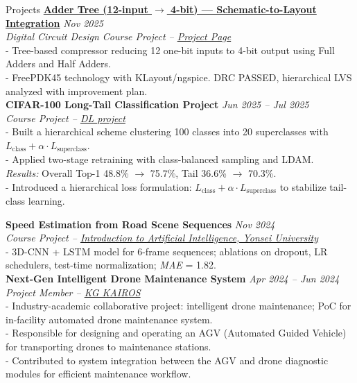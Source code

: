 \documentclass{resume} %
\begin{document}
\begin{rSection}{Projects}
\href{https://choihyun-1110.github.io/projects/adder-tree.html}{\bf Adder Tree (12-input $\rightarrow$ 4-bit) — Schematic-to-Layout Integration} \hfill {\em Nov 2025}  
\\{\textit{Digital Circuit Design Course Project – \href{https://choihyun-1110.github.io/projects/adder-tree.html}{Project Page}}}  
\\- Tree-based compressor reducing 12 one-bit inputs to 4-bit output using Full Adders and Half Adders.
\\- FreePDK45 technology with KLayout/ngspice. DRC PASSED, hierarchical LVS analyzed with improvement plan.
\\

{\bf CIFAR-100 Long-Tail Classification Project} \hfill {\em Jun 2025 – Jul 2025}  
\\{\textit{Course Project – \href{https://www.notion.so/CIFAR-100-Long-Tail-Classification-Project-23f2d399f9118066b2dad938f1925249}{DL project}}}  
\\- Built a hierarchical scheme clustering 100 classes into 20 superclasses with $L_{\text{class}} + \alpha \cdot L_{\text{superclass}}$.  
\\- Applied two-stage retraining with class-balanced sampling and LDAM.
\\
  \textit{Results:} Overall Top-1 48.8\% $\rightarrow$ 75.7\%, Tail 36.6\% $\rightarrow$ 70.3\%.
\\- Introduced a hierarchical loss formulation: $L_{\text{class}} + \alpha \cdot L_{\text{superclass}}$ to stabilize tail-class learning.

{\bf Speed Estimation from Road Scene Sequences} \hfill {\em Nov 2024} 
\\{\textit{Course Project – \href{https://disco-candy-c65.notion.site/AI-1ec2d399f911802d9954c1662a5e78d0?pvs=74}{Introduction to Artificial Intelligence, Yonsei University}}}
\\- 3D-CNN + LSTM model for 6-frame sequences; ablations on dropout, LR schedulers, test-time normalization; \textit{MAE} = 1.82.
\\

{\bf Next-Gen Intelligent Drone Maintenance System} \hfill {\em Apr 2024 – Jun 2024} 
\\{\textit{Project Member – \href{https://disco-candy-c65.notion.site/AGV-389624f2efac475a89e166a4d94b3c10?pvs=4}{KG KAIROS}}}
\\- Industry-academic collaborative project: intelligent drone maintenance; PoC for in-facility automated drone maintenance system.
\\- Responsible for designing and operating an AGV (Automated Guided Vehicle) for transporting drones to maintenance stations.
\\- Contributed to system integration between the AGV and drone diagnostic modules for efficient maintenance workflow.
\\


\end{rSection}
\end{document}
